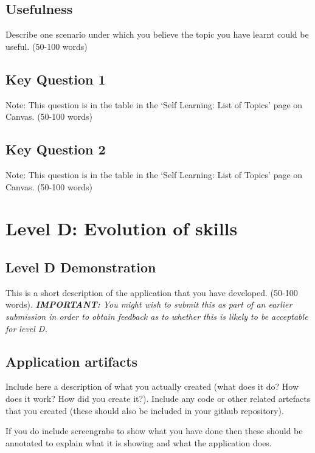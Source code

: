 \documentclass[a4paper, 11pt]{report}
\begin{document}
\subsection{Usefulness}
Describe one scenario under which you believe the topic you have learnt could be useful. (50-100 words)

\subsection{Key Question 1}
Note: This question is in the table in the ‘Self Learning: List of Topics’ page on Canvas. (50-100 words)

\subsection{Key Question 2}
Note: This question is in the table in the ‘Self Learning: List of Topics’ page on Canvas. (50-100 words)



\newpage
\section{Level D: Evolution of skills}
\vspace{5mm}
\subsection{Level D Demonstration}

This is a short description of the application that you have developed. (50-100 words).
\textit{{\bf IMPORTANT:} You might wish to submit this as part of an earlier submission in order to obtain feedback as to whether this is likely to be acceptable for level D.}

\subsection{Application artifacts}

Include here a description of what you actually created (what does it do? How does it work? How did you create it?). Include any code or other related artefacts that you created (these should also be included in your github repository).

If you do include screengrabs to show what you have done then these should be annotated to explain what it is showing and what the application does.
\end{document}
